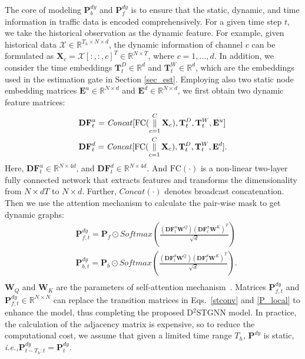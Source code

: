\documentclass[sigconf, nonacm]{acmart}
\def\bb#1{\mathbb{#1}}
\def\b#1{\mathbf{#1}}
\def\cal#1{\mathcal{#1}}
\newcommand{\ie}{\textit{i.e.,}\xspace}
\begin{document}
The core of modeling {\color{black} $\b{P}^{\mathit{dy}}_b$ and $\b{P}^{\mathit{dy}}_f$} is to ensure that the static, dynamic, and time information in traffic data is encoded comprehensively.
{\color{black}
For a given time step $t$, we take the historical observation as the dynamic feature.
For example, {\color{black}given historical data $\mathcal{X}\in\bb{R}^{T_h\times N\times d}$},
the dynamic information of channel $c$ can be formulated as  $\b{X}_c=\cal{X}[:, :, c]^T\in\bb{R}^{N\times T}$, where $c = 1, ..., d$.
In addition, we consider {\color{black}the time embeddings $\mathbf{T}^D_t\in\bb{R}^{d}$ and $\mathbf{T}^W_t \in\bb{R}^{d}$}, which are the embeddings used in the estimation gate in Section \ref{sec_est}.}
Employing also two static node embedding matrices $\b{E}^u\in\bb{R}^{N\times d}$ and $\b{E}^d\in\bb{R}^{N\times d}$, we first obtain two dynamic feature matrices:
\vspace{-0.1cm}
\begin{equation}
\begin{split}
      & \b{DF}^u_{t}=\mathit{Concat}[\text{FC}(\mathop{\parallel}\limits_{c=1}^{C}\b{X}_c),{\color{black}\b{T}^D_t,\b{T}^W_t},\b{E}^u]\\
      & \b{DF}^d_{t}=\mathit{Concat}[\text{FC}(\mathop{\parallel}\limits_{c=1}^{C}\b{X}_c),{\color{black}\b{T}^D_t,\b{T}^W_t},\b{E}^d].
    \end{split}
\end{equation}
Here, $\b{DF}_t^u\in\bb{R}^{N\times 4d}$, and $\b{DF}_t^d\in\bb{R}^{N\times 4d}$.
And $\text{FC}(\cdot)$ is a non-linear two-layer fully connected network that extracts features and transforms the dimensionality from $N \times dT$ to $N \times d$. 
Further, $\mathit{Concat}(\cdot)$ denotes broadcast concatenation.
Then we use the attention mechanism to calculate the pair-wise mask to get dynamic graphs:
\vspace{-0.1cm}
\begin{equation}
\begin{split}
     &\b{P}^{\mathit{dy}}_{f, t}=\b{P}_f\odot \mathit{Softmax}(\frac{(\b{DF}_t^u\b{W}^Q)(\b{DF}_t^u\b{W}^K)^T}{\sqrt{d}})\\
     &\b{P}^{\mathit{dy}}_{b, t}=\b{P}_b\odot \mathit{Softmax}(\frac{(\b{DF}_t^d\b{W}^Q)(\b{DF}_t^d\b{W}^K)^T}{\sqrt{d}}).\\
\end{split}
\label{dy}
\end{equation}
{\color{black}$\mathbf{W}_Q$ and $\mathbf{W}_K$ are the parameters of self-attention mechanism~\cite{2017Transformer}.}
Matrices $\b{P}^{\mathit{dy}}_{f, t}$ and $\b{P}^{\mathit{dy}}_{f, t}\in\bb{R}^{N\times N}$ can replace the transition matrices in Eqs.~\ref{stconv} and \ref{P_local} to enhance the model, thus completing the proposed D$^2$STGNN model. In practice, the calculation of the adjacency matrix is expensive, so to reduce the computational cost, we assume that given a limited time range $T_h$, $\b{P}^{\mathit{dy}}$ is static, \ie $\b{P}^{\mathit{dy}}_{t-T_h:t}=\b{P}^{\mathit{dy}}_{t}$.
\end{document}
